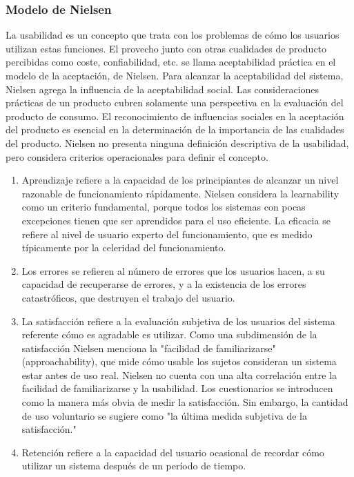 \documentclass[11pt]{article}
\begin{document}
\begin{normalsize}
\begin{flushleft}
	    \subsubsection{Modelo de Nielsen}
	    \begin{itemize}
	        La usabilidad es un concepto que trata con los problemas de cómo los usuarios utilizan estas funciones. El provecho junto con otras cualidades de producto percibidas como coste, confiabilidad, etc. se llama aceptabilidad práctica en el modelo de la aceptación, de Nielsen. Para alcanzar la aceptabilidad del sistema, Nielsen agrega la influencia de la aceptabilidad social. Las consideraciones prácticas de un producto cubren solamente una perspectiva en la evaluación del producto de consumo. El reconocimiento de influencias sociales en la aceptación del producto es esencial en la determinación de la importancia de las cualidades del producto.
            Nielsen no presenta ninguna definición descriptiva de la usabilidad, pero considera criterios operacionales para definir el concepto.

	    \end{itemize}
	    \begin{itemize}
	        \begin{enumerate}
	            \item Aprendizaje refiere a la capacidad de los principiantes de alcanzar un nivel razonable de funcionamiento rápidamente. Nielsen considera la learnability como un criterio fundamental, porque todos los sistemas con pocas excepciones tienen que ser aprendidos para el uso eficiente. La eficacia se refiere al nivel de usuario experto del funcionamiento, que es medido típicamente por la celeridad del funcionamiento.

	            \break
	            \item Los errores se refieren al número de errores que los usuarios hacen, a su capacidad de recuperarse de errores, y a la existencia de los errores catastróficos, que destruyen el trabajo del usuario.
	            \break
	            \item La satisfacción refiere a la evaluación subjetiva de los usuarios del sistema referente cómo es agradable es utilizar. Como una subdimensión de la satisfacción Nielsen menciona la "facilidad de familiarizarse" (approachability), que mide cómo usable los sujetos consideran un sistema estar antes de uso real. Nielsen no cuenta con una alta correlación entre la facilidad de familiarizarse y la usabilidad. Los cuestionarios se introducen como la manera más obvia de medir la satisfacción. Sin embargo, la cantidad de uso voluntario se sugiere como "la última medida subjetiva de la satisfacción."
                \break
	            \item Retención refiere a la capacidad del usuario ocasional de recordar cómo utilizar un sistema después de un período de tiempo.


\end{enumerate}
\end{itemize}
\end{flushleft}
\end{normalsize}
\end{document}
